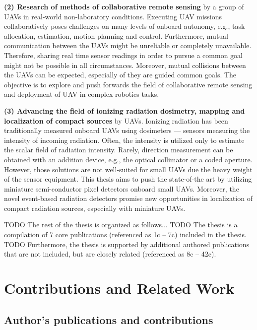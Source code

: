 \documentclass[a4paper,11pt,titlepage,twoside]{book}
\newcommand{\todo}[1]{{\color{red} TODO {#1}}}
\newcommand{\chapternoclear}[1]{
  \begingroup
  \let\cleardoublepage\clearpage
  \chapter{#1}
  \endgroup
}
\begin{document}
\textbf{(2) Research of methods of collaborative remote sensing} by a group of \aclp{UAV} in real-world non-laboratory conditions.
Executing UAV missions collaboratively poses challenges on many levels of onboard autonomy, e.g., task allocation, estimation, motion planning and control.
Furthermore, mutual communication between the \acp{UAV} might be unreliable or completely unavailable.
Therefore, sharing real time sensor readings in order to pursue a common goal might not be possible in all circumstances.
Moreover, mutual collisions between the \acp{UAV} can be expected, especially of they are guided common goals.
The objective is to explore and push forwards the field of collaborative remote sensing and deployment of \ac{UAV} in complex robotics tasks.

\textbf{(3) Advancing the field of ionizing radiation dosimetry, mapping and localization of compact sources} by \aclp{UAV}.
Ionizing radiation has been traditionally measured onboard \acp{UAV} using dosimeters \cite{nagatani2013emergency, sanada2015aerial, towler2012radiation, jiang2016prototype} --- sensors measuring the intensity of incoming radiation.
Often, the intensity is utilized only to estimate the scalar field of radiation intensity.
Rarely, direction measurement can be obtained with an addition device, e.g., the optical collimator or a coded aperture.
However, those solutions are not well-suited for small \acp{UAV} due the heavy weight of the sensor equipment.
This thesis aims to push the state-of-the art by utilizing miniature semi-conductor pixel detectors \cite{llopart2007timepix} onboard small \acp{UAV}.
Moreover, the novel event-based radiation detectors \cite{poikela2014timepix3} promise new opportunities in localization of compact radiation sources, especially with miniature \acp{UAV}.

\todo{The rest of the thesis is organized as follows...}
\todo{The thesis is a compilation of 7 core publications (referenced as 1c -- 7c) included in the thesis.}
\todo{Furthermore, the thesis is supported by additional authored publications that are not included, but are closely related (referenced as 8c -- 42c).}




\chapternoclear{Contributions and Related Work}

\section{Author's publications and contributions}
\end{document}
